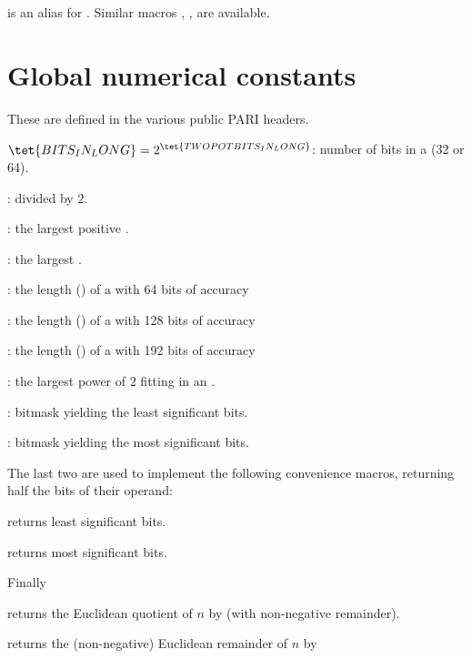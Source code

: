  is an alias for .
Similar macros , ,  are available.

\section{Global numerical constants}
These are defined in the various public PARI headers.


\noindent {} $\tet{BITS_IN_LONG} = 2^{\tet{TWOPOTBITS_IN_LONG}}$:
number of bits in a  (32 or 64).

\noindent {} :  divided by
$2$.

\noindent {} : the largest positive .

\noindent {} : the largest .

\noindent {} :    the length () of a
 with 64 bits of accuracy

\noindent {} : the length () of a
 with 128 bits of accuracy

\noindent {} : the length () of a
 with 192 bits of accuracy

\noindent {} : the largest power of $2$ fitting in an
.

\noindent {} : bitmask yielding the least significant
bits.

\noindent {} : bitmask yielding the most significant
bits.

\noindent The last two are used to implement the following convenience macros,
returning half the bits of their operand:

 returns least significant bits.

 returns most significant bits.

\noindent Finally

 returns the Euclidean quotient of $n$ by
 (with non-negative remainder).

 returns the (non-negative) Euclidean remainder of $n$
by 

